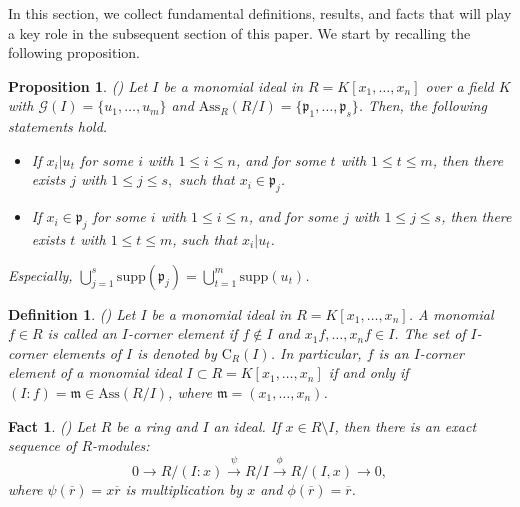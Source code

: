 \documentclass[11pt]{amsart}
\newtheorem{fact}[theorem]{Fact}
\newtheorem{proposition}[theorem]{Proposition}
\newtheorem{definition}[theorem]{Definition}
\begin{document}
In this section, we collect fundamental definitions, results, and facts that will play a key role in the subsequent section of this paper. We start by
 recalling the following proposition.   


\begin{proposition}\label{Pro.supp} (\cite[Proposition 4.2]{NKRT})
Let  $I$ be   a monomial ideal in $R=K[x_1, \ldots, x_n]$ over a field $K$ with $\mathcal{G}(I)=\{u_1, \ldots, u_m\}$ and $\mathrm{Ass}_R(R/I)=\{\mathfrak{p}_1, \ldots, \mathfrak{p}_s\}$. Then, the following statements hold. 
\begin{itemize}
\item[(i)] If $x_i|u_t$ for some $i$ with  $1\leq i \leq n$, and  
for some $t$ with  $1\leq t \leq m$, then there exists $j$ with  $1\leq j \leq s,$ 
such that $x_i\in \mathfrak{p}_j$. 
\item[(ii)] If $x_i\in \mathfrak{p}_j$ for some $i$ with  $1\leq i \leq n$, and  for some $j$ with   $1\leq j \leq s$, then  there exists $t$ with  
 $1\leq t \leq m$, such that  $x_i|u_t$. 
\end{itemize} 
Especially, $\bigcup_{j=1}^s \mathrm{supp}(\mathfrak{p}_j)=\bigcup_{t=1}^m \mathrm{supp}(u_t)$.
\end{proposition}

  




\begin{definition} (\cite[Definition 6.2.1]{MRS}) \label{Def. Corner elements}
\em{
Let $I$ be a monomial ideal in $R=K[x_1, \ldots, x_n]$. A monomial $f\in R$  is called an \textit{$I$-corner element} if $f\notin I$  and 
$x_1f, \ldots, x_nf \in I$.  The set of  $I$-corner elements of $I$  is denoted by $\mathrm{C}_R(I)$.
In particular,  $f$ is an $I$-corner element  of a monomial ideal $I \subset R=K[x_1, \ldots, x_n]$ if and only if $(I:f)=\mathfrak{m}\in \mathrm{Ass}(R/I)$, 
where $\mathfrak{m}=(x_1, \ldots, x_n)$.  
}
\end{definition}



\begin{fact}\label{fact2} (\cite[Exercise 2.1.62]{V1})
Let $R$  be a ring and $I$ an ideal. If $x \in R \setminus I$, 
 then there is an exact sequence of $R$-modules: 
 $$0\longrightarrow R/(I:x)\stackrel{\psi}{\longrightarrow} R/I \stackrel{\phi}{\longrightarrow} R/(I,x) \longrightarrow  0,$$
 where $\psi(\overline{r})= x\overline{r}$ is multiplication by $x$ and 
 $\phi(\overline{r}) =\overline{r}$.
\end{fact}
\end{document}
